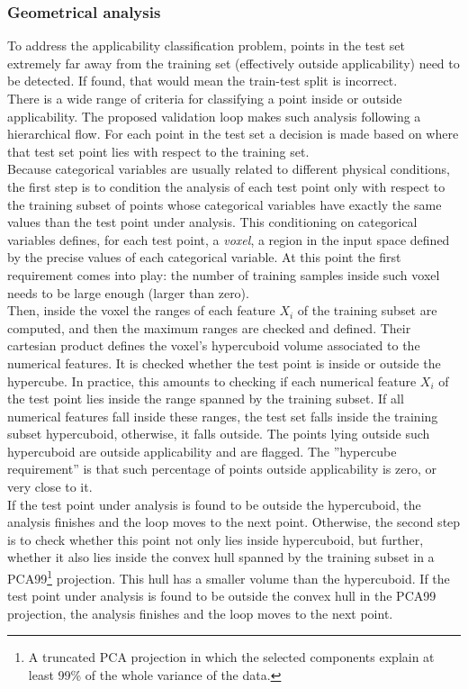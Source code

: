 \subsubsection{Geometrical analysis}
\indent To address the applicability classification problem, points in the test set extremely far away from the training set (effectively outside applicability) need to be detected. If found, that would mean the train-test split is incorrect.\\
%
\indent There is a wide range of criteria for classifying a point inside or outside applicability. The proposed validation loop makes such analysis following a hierarchical flow. For each point in the test set a decision is made based on where that test set point lies with respect to the training set.\\
%
\indent Because categorical variables are usually related to different physical conditions, the first step is to condition the analysis of each test point only with respect to the training subset of points whose categorical variables have exactly the same values than the test point under analysis. This conditioning on categorical variables defines, for each test point, a \textit{voxel}, \ie a region in the input space defined by the precise values of each categorical variable. At this point the first requirement comes into play: the number of training samples inside such voxel needs to be large enough (\eg larger than zero).\\
%
\indent Then, inside the voxel the ranges of each feature $X_i$ of the training subset are computed, and then the maximum ranges are checked and defined. Their cartesian product defines the voxel's hypercuboid volume associated to the numerical features. It is checked whether the test point is inside or outside the hypercube. In practice, this amounts to checking if each numerical feature $X_i$ of the test point lies inside the range spanned by the training subset. If all numerical features fall inside these ranges, the test set falls inside the training subset hypercuboid, otherwise, it falls outside. The points lying outside such hypercuboid are outside applicability and are flagged. The ''hypercube requirement'' is that such percentage of points outside applicability is zero, or very close to it.\\
%
\indent If the test point under analysis is found to be outside the hypercuboid, the analysis finishes and the loop moves to the next point. Otherwise, the second step is to check whether this point not only lies inside hypercuboid, but further, whether it also lies inside the convex hull spanned by the training subset in a PCA99\footnote{A truncated PCA\cite{hotelling1933analysis} projection in which the selected components explain at least 99\% of the whole variance of the data.} projection. This hull has a smaller volume than the hypercuboid. If the test point under analysis is found to be outside the convex hull in the PCA99 projection, the analysis finishes and the loop moves to the next point.\\
